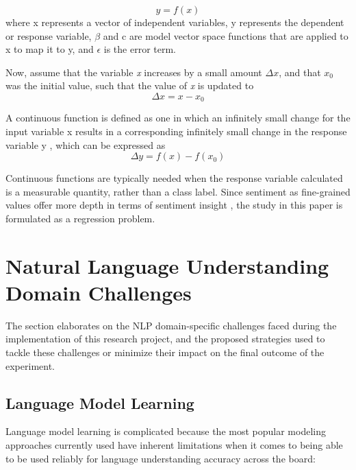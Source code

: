 \documentclass[conference]{IEEEtran}
\begin{document}
        \begin{equation}
            \displaystyle y = f(x)
        \end{equation}
        where x represents a vector of independent variables, y represents the dependent or response variable, $\beta$ and c are model vector space functions that are applied to x to map it to y, and $\epsilon$ is the error term.

        Now, assume that the variable \textit{x} increases by a small amount $\Delta x$, and that $x_0$ was the initial value, such that the value of \textit{x} is updated to
        \begin{equation}
            \displaystyle \Delta x = x - x_0
        \end{equation}

        A continuous function is defined as one in which an infinitely small change for the input variable x results in a corresponding infinitely small change in the response variable y \cite{continuous_function}, which can be expressed as
        \begin{equation}
            \displaystyle \Delta y = f(x) - f(x_0)
        \end{equation}

        Continuous functions are typically needed when the response variable calculated is a measurable quantity, rather than a class label. Since sentiment as fine-grained values offer more depth in terms of sentiment insight \cite{drake2008sentiment}, the study in this paper is formulated as a regression problem.

\vspace{5mm}

\section{Natural Language Understanding Domain Challenges}
    The section elaborates on the NLP domain-specific challenges faced during the implementation of this research project, and the proposed strategies used to tackle these challenges or minimize their impact on the final outcome of the experiment.

    \subsection{Language Model Learning}
        Language model learning is complicated because the most popular modeling approaches currently used have inherent limitations when it comes to being able to be used reliably for language understanding accuracy across the board:
        
\end{document}
